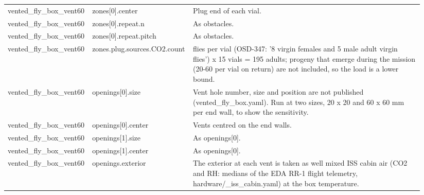 \begin{longtable}{>{\raggedright\arraybackslash}p{0.17\linewidth}>{\raggedright\arraybackslash}p{0.22\linewidth}>{\raggedright\arraybackslash}p{0.55\linewidth}}
vented\_\allowbreak{}fly\_\allowbreak{}box\_\allowbreak{}vent60 & zones[0]\allowbreak{}.\allowbreak{}center & Plug end of each vial. \\
vented\_\allowbreak{}fly\_\allowbreak{}box\_\allowbreak{}vent60 & zones[0]\allowbreak{}.\allowbreak{}repeat.\allowbreak{}n & As obstacles. \\
vented\_\allowbreak{}fly\_\allowbreak{}box\_\allowbreak{}vent60 & zones[0]\allowbreak{}.\allowbreak{}repeat.\allowbreak{}pitch & As obstacles. \\
vented\_\allowbreak{}fly\_\allowbreak{}box\_\allowbreak{}vent60 & zones.\allowbreak{}plug.\allowbreak{}sources.\allowbreak{}CO2.\allowbreak{}count & 13 flies per vial (OSD-347: '8 virgin females and 5 male adult virgin flies') x 15 vials = 195 adults; progeny that emerge during the mission (20-60 per vial on return) are not included, so the load is a lower bound. \\
vented\_\allowbreak{}fly\_\allowbreak{}box\_\allowbreak{}vent60 & openings[0]\allowbreak{}.\allowbreak{}size & Vent hole number, size and position are not published (vented\_fly\_box.yaml). Run at two sizes, 20 x 20 and 60 x 60 mm per end wall, to show the sensitivity. \\
vented\_\allowbreak{}fly\_\allowbreak{}box\_\allowbreak{}vent60 & openings[0]\allowbreak{}.\allowbreak{}center & Vents centred on the end walls. \\
vented\_\allowbreak{}fly\_\allowbreak{}box\_\allowbreak{}vent60 & openings[1]\allowbreak{}.\allowbreak{}size & As openings[0]. \\
vented\_\allowbreak{}fly\_\allowbreak{}box\_\allowbreak{}vent60 & openings[1]\allowbreak{}.\allowbreak{}center & As openings[0]. \\
vented\_\allowbreak{}fly\_\allowbreak{}box\_\allowbreak{}vent60 & openings.\allowbreak{}exterior & The exterior at each vent is taken as well mixed ISS cabin air (CO2 and RH: medians of the EDA RR-1 flight telemetry, hardware/\_iss\_cabin.yaml) at the box temperature. \\
\bottomrule
\end{longtable}
\normalsize
